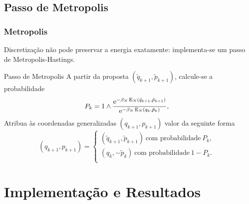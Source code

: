 \subsection{Passo de Metropolis}
\begin{frame}
	\frametitle{Metropolis}
	Discretização não pode preservar a energia exatamente: implementa-se um passo de Metropolis-Hastings.
	
	\pause
	
	\begin{block}{Passo de Metropolis}
		A partir da proposta $(\tilde{q}_{k+1},\tilde{p}_{k+1})$, calcule-se a probabilidade
		\[
			P_k = 1 \wedge \frac{\operatorname{e}^{-\beta_N \operatorname{E}_N(\tilde{q}_{k+1}, \tilde{p}_{k+1})}}{\operatorname{e}^{-\beta_N \operatorname{E}_N(q_{k}, \tilde{p}_{k})}},
		\]
		Atribua às coordenadas generalizadas $(q_{k+1}, p_{k+1})$ valor da seguinte forma
		\[
			(q_{k+1}, p_{k+1}) =
			\begin{cases}
				(\tilde{q}_{k+1}, \tilde{p}_{k+1}) \ \text{com 	probabilidade} \ P_k, \\
				(q_k, -\tilde{p}_{k}) \ \text{com probabilidade} \ 	1-P_k. \\
			\end{cases}
		\]
	\end{block}

\end{frame}


\section{Implementação e Resultados}

